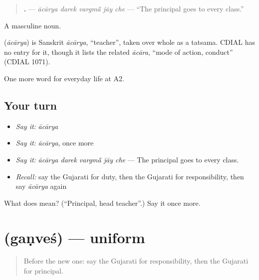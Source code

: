 \begin{quote}
\textbf{    .} — \emph{ācārya darek vargmā̃ jāy che} — \textquotedblleft{}The principal goes to every class.\textquotedblright{}
\end{quote}

A masculine noun.

\begin{cousinweb}
\textbf{} (\emph{ācārya}) is Sanskrit \emph{ācārya}, \textquotedblleft{}teacher\textquotedblright{}, taken over whole as a tatsama. CDIAL has no entry for it, though it lists the related \emph{ācāra}, \textquotedblleft{}mode of action, conduct\textquotedblright{} (CDIAL 1071).
\end{cousinweb}

\begin{grammarlens}[title={What you've built}]
One more word for everyday life at A2.
\end{grammarlens}

\subsection*{Your turn}
\begin{itemize}
\raggedright
  \item \emph{Say it:} \emph{ācārya}
  \item \emph{Say it:} \emph{ācārya}, once more
  \item \emph{Say it:} \emph{ācārya darek vargmā̃ jāy che} — The principal goes to every class.
  \item \emph{Recall:} say the Gujarati for duty, then the Gujarati for responsibility, then say \emph{ācārya} again
\end{itemize}

\begin{tcolorbox}[breakable,colback=teal!4,colframe=teal!35!black,title={Before you move on}]
What does  mean? (\textquotedblleft{}Principal, head teacher\textquotedblright{}.) Say it once more.
\end{tcolorbox}
\section[\texorpdfstring{\gu{ગણવેશ} (gaṇveś)}{ગણવેશ (gaṇveś)}]{ (gaṇveś) — uniform}

\label{lesson:GU-C252-ganvesh}



\begin{quote}
Before the new one: say the Gujarati for responsibility, then the Gujarati for principal.
\end{quote}

